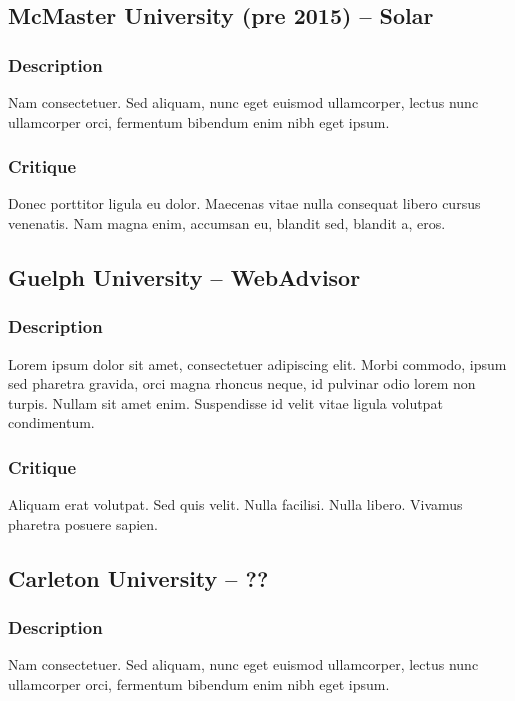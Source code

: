 \documentclass[10pt]{article}
\begin{document}
\begin{multicols}{2}
\subsection*{McMaster University (pre 2015) -- Solar}
\subsubsection*{Description}
Nam consectetuer. Sed aliquam, nunc eget euismod ullamcorper, lectus nunc ullamcorper orci, fermentum bibendum enim nibh eget ipsum.

\subsubsection*{Critique}
Donec porttitor ligula eu dolor. Maecenas vitae nulla consequat libero cursus venenatis. Nam magna enim, accumsan eu, blandit sed, blandit a, eros.

\subsection*{Guelph University -- WebAdvisor}
\subsubsection*{Description}
Lorem ipsum dolor sit amet, consectetuer adipiscing elit. Morbi commodo, ipsum sed pharetra gravida, orci magna rhoncus neque, id pulvinar odio lorem non turpis. Nullam sit amet enim. Suspendisse id velit vitae ligula volutpat condimentum. 

\subsubsection*{Critique}
Aliquam erat volutpat. Sed quis velit. Nulla facilisi. Nulla libero. Vivamus pharetra posuere sapien. 

\subsection*{Carleton University -- ??}
\subsubsection*{Description}
Nam consectetuer. Sed aliquam, nunc eget euismod ullamcorper, lectus nunc ullamcorper orci, fermentum bibendum enim nibh eget ipsum. 


\end{multicols}
\end{document}
